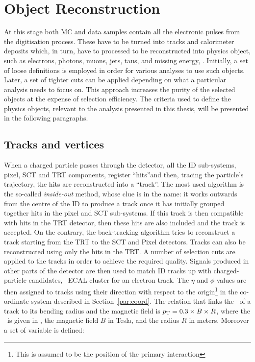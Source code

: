 	\section{Object Reconstruction}
	\label{sec:objReco}

		At this stage both \ac{MC} and data samples contain all the electronic pulses from the digitisation process. These have to be turned into tracks and calorimeter deposits which, in turn, have to processed to be reconstructed into physics object, such as electrons, photons, muons, jets, taus, and missing energy, \met. Initially, a set of loose definitions is employed in order for various analyses to use such objects. Later, a set of tighter cuts can be applied depending on what a particular analysis needs to focus on. This approach increases the purity of the selected objects at the expense of selection efficiency. The criteria used to define the physics objects, relevant to the analysis presented in this thesis, will be presented in the following paragraphs.


		\subsection*{Tracks and vertices}

			When a charged particle passes through the detector, all the \ac{ID} sub-systems, pixel, \ac{SCT} and \ac{TRT} components, register ``hits''and then, tracing the particle's trajectory, the hits are reconstructed into a ``track''. The most used algorithm is the so-called \emph{inside-out} method, whose clue is in the name: it works outwards from the centre of the \ac{ID} to produce a track once it has initially grouped together hits in the pixel and \ac{SCT} sub-systems. If this track is then compatible with hits in the \ac{TRT} detector, then these hits are also included and the track is accepted. On the contrary, the back-tracking algorithm tries to reconstruct a track starting from the \ac{TRT} to the \ac{SCT} and Pixel detectors. Tracks can also be reconstructed using only the hits in the \ac{TRT}. A number of selection cuts are applied to the tracks in order to achieve the required quality. Signals produced in other parts of the detector are then used to match \ac{ID} tracks up with charged-particle candidates, \eg\ \ac{ECAL} cluster for an electron track. The $\eta$ and $\phi$ values are then assigned to tracks using their direction with respect to the origin\footnote{This is assumed to be the position of the primary interaction} in the co-ordinate system described in Section~\ref{par:coord}. The relation that links the \pt\ of a track to its bending radius and the magnetic field is $p_{\mathrm{T}} = 0.3 \times B \times R$, where the \pt\ is given in \GeV, the magnetic field $B$ in Tesla, and the radius $R$ in meters. Moreover a set of variable is defined:

